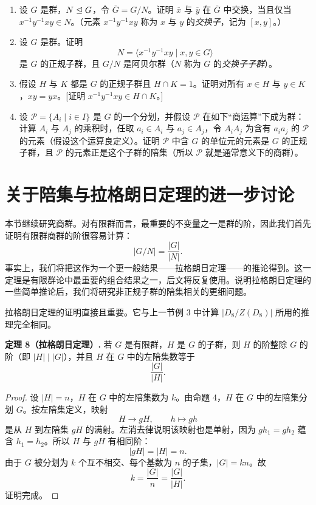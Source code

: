 \begin{enumerate}[label=\arabic*.]
  \item 设 $G$ 是群，$N\trianglelefteq G$，令 $\overline G=G/N$。证明 $\overline x$ 与 $\overline y$ 在 $\overline G$ 中交换，当且仅当 $x^{-1}y^{-1}xy\in N$。（元素 $x^{-1}y^{-1}xy$ 称为 $x$ 与 $y$ 的\emph{交换子}，记为 $[x,y]$。）
  \item 设 $G$ 是群。证明
  \[
    N=\langle x^{-1}y^{-1}xy\mid x,y\in G\rangle
  \]
  是 $G$ 的正规子群，且 $G/N$ 是阿贝尔群（$N$ 称为 $G$ 的\emph{交换子子群}）。
  \item 假设 $H$ 与 $K$ 都是 $G$ 的正规子群且 $H\cap K=1$。证明对所有 $x\in H$ 与 $y\in K$，$xy=yx$。[证明 $x^{-1}y^{-1}xy\in H\cap K$。]
  \item 设 $\mathcal P=\{A_i\mid i\in I\}$ 是 $G$ 的一个分划，并假设 $\mathcal P$ 在如下“商运算”下成为群：计算 $A_i$ 与 $A_j$ 的乘积时，任取 $a_i\in A_i$ 与 $a_j\in A_j$，令 $A_iA_j$ 为含有 $a_ia_j$ 的 $\mathcal P$ 的元素（假设这个运算良定义）。证明 $\mathcal P$ 中含 $G$ 的单位元的元素是 $G$ 的正规子群，且 $\mathcal P$ 的元素正是这个子群的陪集（所以 $\mathcal P$ 就是通常意义下的商群）。
\end{enumerate}

\section{关于陪集与拉格朗日定理的进一步讨论}

本节继续研究商群。对有限群而言，最重要的不变量之一是群的阶，因此我们首先证明有限群商群的阶很容易计算：
\[
  |G/N|=\frac{|G|}{|N|}.
\]
事实上，我们将把这作为一个更一般结果——拉格朗日定理——的推论得到。这一定理是有限群论中最重要的组合结果之一，后文将反复使用。说明拉格朗日定理的一些简单推论后，我们将研究非正规子群的陪集相关的更细问题。

拉格朗日定理的证明直接且重要。它与上一节例 3 中计算 $|D_8/Z(D_8)|$ 所用的推理完全相同。

\medskip
\noindent\textbf{定理 8（拉格朗日定理）.} 若 $G$ 是有限群，$H$ 是 $G$ 的子群，则 $H$ 的阶整除 $G$ 的阶（即 $|H|\mid |G|$），并且 $H$ 在 $G$ 中的左陪集数等于
\[
  \frac{|G|}{|H|}.
\]

\begin{proof}
设 $|H|=n$，$H$ 在 $G$ 中的左陪集数为 $k$。由命题 4，$H$ 在 $G$ 中的左陪集分划 $G$。按左陪集定义，映射
\[
  H\to gH,
  \qquad h\mapsto gh
\]
是从 $H$ 到左陪集 $gH$ 的满射。左消去律说明该映射也是单射，因为 $gh_1=gh_2$ 蕴含 $h_1=h_2$。所以 $H$ 与 $gH$ 有相同阶：
\[
  |gH|=|H|=n.
\]
由于 $G$ 被分划为 $k$ 个互不相交、每个基数为 $n$ 的子集，$|G|=kn$。故
\[
  k=\frac{|G|}{n}=\frac{|G|}{|H|}.
\]
证明完成。
\end{proof}

